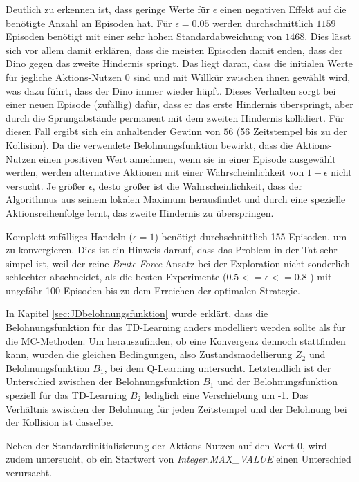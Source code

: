 Deutlich zu erkennen ist, dass geringe Werte für $\epsilon$ einen negativen Effekt auf die benötigte Anzahl an Episoden hat. Für $\epsilon = 0.05$ werden durchschnittlich $1159$ Episoden benötigt mit einer sehr hohen Standardabweichung von $1468$. Dies lässt sich vor allem damit erklären, dass die meisten Episoden damit enden, dass der Dino gegen das zweite Hindernis springt. Das liegt daran, dass die initialen Werte für jegliche Aktions-Nutzen 0 sind und mit Willkür zwischen ihnen gewählt wird, was dazu führt, dass der Dino immer wieder hüpft. Dieses Verhalten sorgt bei einer neuen Episode (zufällig) dafür, dass er das erste Hindernis überspringt, aber durch die Sprungabstände permanent mit dem zweiten Hindernis kollidiert. Für diesen Fall ergibt sich ein anhaltender Gewinn von $56$ (56 Zeitstempel bis zu der Kollision). Da die verwendete Belohnungsfunktion bewirkt, dass die Aktions-Nutzen einen positiven Wert annehmen, wenn sie in einer Episode ausgewählt werden, werden alternative Aktionen mit einer Wahrscheinlichkeit von $1-\epsilon$ nicht versucht. Je größer $\epsilon$, desto größer ist die Wahrscheinlichkeit, dass der Algorithmus aus seinem lokalen Maximum herausfindet und durch eine spezielle Aktionsreihenfolge lernt, das zweite Hindernis zu überspringen.
\par
Komplett zufälliges Handeln ($\epsilon = 1$) benötigt durchschnittlich 155 Episoden, um zu konvergieren. Dies ist ein Hinweis darauf, dass das Problem in der Tat sehr simpel ist, weil der reine \textit{Brute-Force}-Ansatz bei der Exploration nicht sonderlich schlechter abschneidet, als die besten Experimente ($0.5 <= \epsilon <= 0.8$ ) mit ungefähr 100 Episoden bis zu dem Erreichen der optimalen Strategie.

\par 
In Kapitel \ref{sec:JDbelohnungsfunktion} wurde erklärt, dass die Belohnungsfunktion für das TD-Learning anders modelliert werden sollte als für die MC-Methoden. Um herauszufinden, ob eine Konvergenz dennoch stattfinden kann, wurden die gleichen Bedingungen, also Zustandsmodellierung $Z_2$ und Belohnungsfunktion $B_1$, bei dem Q-Learning untersucht. Letztendlich ist der Unterschied zwischen der Belohnungsfunktion $B_1$ und der Belohnungsfunktion speziell für das TD-Learning $B_2$ lediglich eine Verschiebung um -1. Das Verhältnis zwischen der Belohnung für jeden Zeitstempel und der Belohnung bei der Kollision ist dasselbe.
\par 
Neben der Standardinitialisierung der Aktions-Nutzen auf den Wert 0, wird zudem untersucht, ob ein Startwert von \textit{Integer.MAX\_VALUE} einen Unterschied verursacht.

